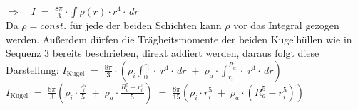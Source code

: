 $\displaystyle \Rightarrow\quad I \;=\; \frac{8\pi}{3} \cdot \int \rho(r) \cdot r^4\cdot \, dr$
\\[8pt]
Da $\rho=const.$ für jede der beiden Schichten kann $\rho$ vor das Integral gezogen werden. Außerdem dürfen die Trägheitsmomente der beiden Kugelhüllen wie in Sequenz 3 bereits beschrieben, direkt addiert werden\parencite{brenneke_schuster_ges-traegheit}, daraus folgt diese Darstellung: 
$\displaystyle I_\text{Kugel} \;=\; \frac{8\pi}{3} \cdot\left(\rho_i \int_{0}^{r_i} \cdot \; r^4\cdot \, dr \; + \; \rho_a \cdot \int_{r_i}^{R_a}  \cdot \; r^4\cdot \, dr \right)$
\\[8pt]
$\displaystyle I_\text{Kugel} \;=\; \frac{8\pi}{3}\left( \rho_i \cdot \frac{r_i^5}{5} \;+\; \rho_a \cdot \frac{R_a^5 - r_i^5}{5} \right)\;=\; \frac{8\pi}{15} \left( \rho_i \cdot r_i^5 \;+\; \rho_a \cdot (R_a^5 - r_i^5)\right)$
\\[8pt]

